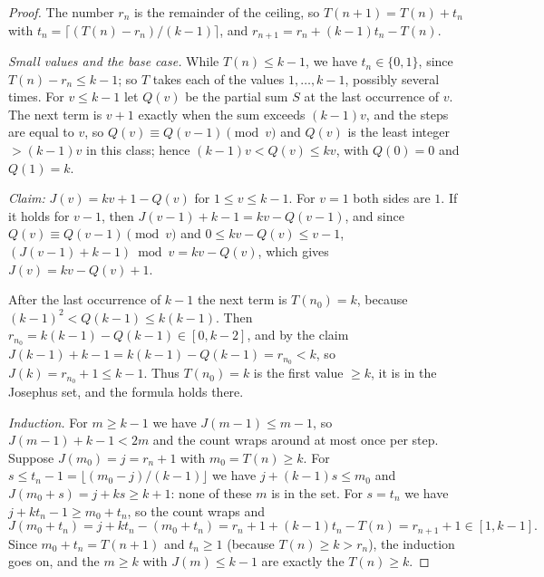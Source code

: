 \begin{proof} The number $r_n$ is the remainder of the ceiling, so $T(n+1)=T(n)+t_n$ with
$t_n=\lceil(T(n)-r_n)/(k-1)\rceil$, and $r_{n+1}=r_n+(k-1)t_n-T(n)$.

\emph{Small values and the base case.} While $T(n)\le k-1$, we have $t_n\in\{0,1\}$, since
$T(n)-r_n\le k-1$; so $T$ takes each of the values $1,\dots,k-1$, possibly several times. For $v\le k-1$ let
$Q(v)$ be the partial sum $S$ at the last occurrence of $v$. The next term is $v+1$ exactly when the sum
exceeds $(k-1)v$, and the steps are equal to $v$, so $Q(v)\equiv Q(v-1)\pmod v$ and $Q(v)$ is the least
integer $>(k-1)v$ in this class; hence $(k-1)v<Q(v)\le kv$, with $Q(0)=0$ and $Q(1)=k$.

\emph{Claim:} $J(v)=kv+1-Q(v)$ for $1\le v\le k-1$. For $v=1$ both sides are $1$. If it holds for $v-1$, then
$J(v-1)+k-1=kv-Q(v-1)$, and since $Q(v)\equiv Q(v-1)\pmod v$ and $0\le kv-Q(v)\le v-1$,
$(J(v-1)+k-1)\bmod v=kv-Q(v)$, which gives $J(v)=kv-Q(v)+1$.

After the last occurrence of $k-1$ the next term is $T(n_0)=k$, because $(k-1)^2<Q(k-1)\le k(k-1)$. Then
$r_{n_0}=k(k-1)-Q(k-1)\in[0,k-2]$, and by the claim $J(k-1)+k-1=k(k-1)-Q(k-1)=r_{n_0}<k$, so
$J(k)=r_{n_0}+1\le k-1$. Thus $T(n_0)=k$ is the first value $\ge k$, it is in the Josephus set, and the formula
holds there.

\emph{Induction.} For $m\ge k-1$ we have $J(m-1)\le m-1$, so $J(m-1)+k-1<2m$ and the count wraps around at
most once per step. Suppose $J(m_0)=j=r_n+1$ with $m_0=T(n)\ge k$. For $s\le t_n-1=\lfloor(m_0-j)/(k-1)\rfloor$
we have $j+(k-1)s\le m_0$ and $J(m_0+s)=j+ks\ge k+1$: none of these $m$ is in the set. For $s=t_n$ we have
$j+kt_n-1\ge m_0+t_n$, so the count wraps and
\[ J(m_0+t_n)=j+kt_n-(m_0+t_n)=r_n+1+(k-1)t_n-T(n)=r_{n+1}+1\in[1,k-1]. \]
Since $m_0+t_n=T(n+1)$ and $t_n\ge1$ (because $T(n)\ge k>r_n$), the induction goes on, and the $m\ge k$ with
$J(m)\le k-1$ are exactly the $T(n)\ge k$. \end{proof}


